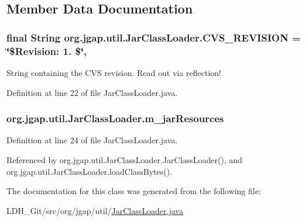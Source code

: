 \subsection{Member Data Documentation}
\hypertarget{classorg_1_1jgap_1_1util_1_1_jar_class_loader_a3de58256ce21ba05f55b2518a7f21031}{
\subsubsection[{C\-V\-S\-\_\-\-R\-E\-V\-I\-S\-I\-O\-N}]{\setlength{\rightskip}{0pt plus 5cm}final String org.\-jgap.\-util.\-Jar\-Class\-Loader.\-C\-V\-S\-\_\-\-R\-E\-V\-I\-S\-I\-O\-N = \char`\"{}\$Revision\-: 1. \$\char`\"{}\hspace{0.3cm}{\ttfamily [static]}, {\ttfamily [private]}}}\label{classorg_1_1jgap_1_1util_1_1_jar_class_loader_a3de58256ce21ba05f55b2518a7f21031}
String containing the C\-V\-S revision. Read out via reflection! 

Definition at line 22 of file Jar\-Class\-Loader.\-java.

\hypertarget{classorg_1_1jgap_1_1util_1_1_jar_class_loader_a000e53524a68ae339edf16105977397b}{
\subsubsection[{m\-\_\-jar\-Resources}]{ org.\-jgap.\-util.\-Jar\-Class\-Loader.\-m\-\_\-jar\-Resources\hspace{0.3cm}{\ttfamily [private]}}}\label{classorg_1_1jgap_1_1util_1_1_jar_class_loader_a000e53524a68ae339edf16105977397b}


Definition at line 24 of file Jar\-Class\-Loader.\-java.



Referenced by org.\-jgap.\-util.\-Jar\-Class\-Loader.\-Jar\-Class\-Loader(), and org.\-jgap.\-util.\-Jar\-Class\-Loader.\-load\-Class\-Bytes().



The documentation for this class was generated from the following file\-:\begin{DoxyCompactItemize}
\item 
L\-D\-H\-\_\-\-Git/src/org/jgap/util/\hyperlink{_jar_class_loader_8java}{Jar\-Class\-Loader.\-java}\end{DoxyCompactItemize}
